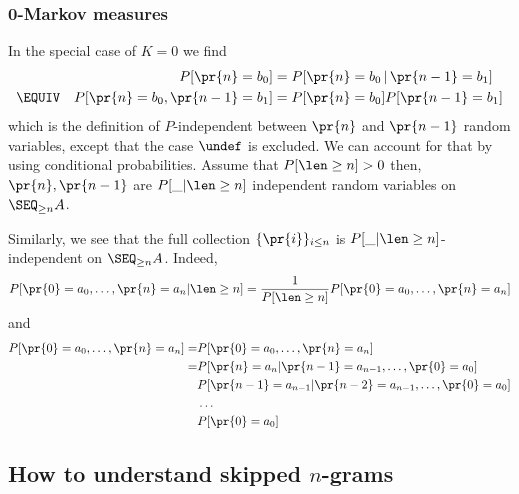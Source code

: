 \documentclass[11pt]{article}
\begin{document}
\subsubsection{0-Markov measures}
In the special case of $K=0$ we find
\begin{align*}
  P[\pr{n} = b_0 ] &= P[ \pr{n} = b_0 \,|\, \pr{n-1} = b_1] \\
  \EQUIV \quad P[ \pr{n} = b_0,  \pr{n-1} = b_1 ] 
                   &= P[ \pr{n} = b_0 ] P[\pr{n-1} = b_1 ]
\end{align*}
which is the definition of $P$-independent between $\pr{n}$ and
$\pr{n-1}$ random variables, except that the case $\undef$ is
excluded. We can account for that by using conditional probabilities.
Assume that $P[\len \geq n] > 0$ then, $\pr{n}, \pr{n-1}$ are
$P[\_|\len \geq n]$ independent random variables on $\SEQ_{\geq n} A$.

Similarly, we see that the full collection $\{ \pr{i} \}_{i \leq n}$ 
is $P[\_|\len \geq n]$-independent on $\SEQ_{\geq n} A$. Indeed, 
\[     P[ \pr{0} = a_0, \dots, \pr{n} = a_n | \len \geq n]
  = \frac{1}{P[\len \geq n]} P[ \pr{0} = a_0, \dots, \pr{n} = a_n ] \]
and
\begin{align*}
 P[ \pr{0} = a_0, \dots, \pr{n} = a_n] = &P[ \pr{0} = a_0, \dots, \pr{n} = a_n ] \\
  = & P[ \pr{n} = a_n     | \pr{n-1}=a_{n-1}, \dots, \pr{0} = a_0 ]  \\
    & P[\pr{n-1} = a_{n-1}| \pr{n-2}=a_{n-1}, \dots, \pr{0} = a_0 ]  \\
    & \dots \\
    & P[\pr{0} = a_{0}]
\end{align*}

\subsection{How to understand skipped $n$-grams}
\end{document}
